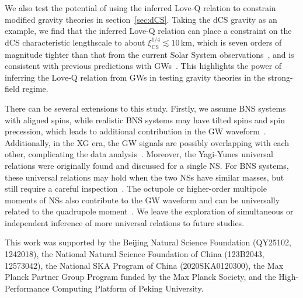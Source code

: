 \documentclass[a4paper,11pt]{article}
\begin{document}
We also test the potential of using the inferred Love-Q relation to constrain
modified gravity theories in section~\ref{sec:dCS}.  Taking the dCS gravity as
an example, we find that the inferred Love-Q relation can place a constraint on
the dCS characteristic lengthscale to about $\xi_{\mathrm{CS}}^{1/4} \lesssim
10$\,km, which is seven orders of magnitude tighter than that from the current
Solar System observations~\cite{Ali-Haimoud:2011zme, Yagi:2012ya}, and is
consistent with previous predictions with GWs~\cite{Yagi:2013bca, Yagi:2013awa}.
This highlights the power of inferring the Love-Q relation from GWs in testing
gravity theories in the strong-field regime. 

There can be several extensions to this study. Firstly, we assume  BNS systems
with aligned spins, while realistic BNS systems may have tilted spins and spin
precession, which leads to additional contribution in the GW
waveform~\cite{Williamson:2017evr, Purrer:2019jcp, Gamba:2020wgg}. 
Additionally, in the XG era, the GW signals are possibly overlapping with each
other, complicating the data analysis~\cite{Pizzati:2021apa, Samajdar:2021egv,
Wang:2023ldq, Johnson:2024foj, Wang:2025ckw}.  Moreover, the Yagi-Yunes
universal relations were originally found and discussed for a single NS. For BNS
systems, these universal relations may hold when the two NSs have similar
masses, but still require a careful inspection~\cite{Shao:2022koz,
Saffer:2021gak}. The octupole or higher-order multipole moments of NSs also
contribute to the GW waveform and can be universally related to the quadrupole
moment~\cite{Yagi_2017, Abac:2023ujg}.  We leave the exploration of simultaneous
or independent inference of more universal relations to future studies.

\acknowledgments

This work was supported by the Beijing Natural Science Foundation (QY25102,
1242018), the National Natural Science Foundation of China (123B2043, 12573042),
the National SKA Program of China (2020SKA0120300), the Max Planck Partner Group
Program funded by the Max Planck Society, and the High-Performance Computing
Platform of Peking University. 




\end{document}
